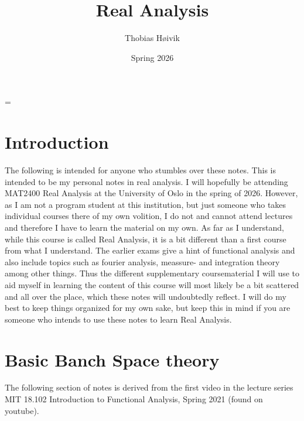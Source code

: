 
\hfuzz=\maxdimen

\title{\huge{Real Analysis}}
\author{\LARGE{Thobias Høivik}}
\date{\Large{Spring 2026}}


\maketitle

\newpage
\tableofcontents

\newpage
\section{Introduction}
The following is intended for anyone who stumbles over these notes. 
This is intended to be my personal notes in real analysis. 
I will hopefully be attending MAT2400 Real Analysis at 
the University of Oslo in the spring of 2026. However, 
as I am not a program student at this institution, but 
just someone who takes individual courses there 
of my own volition, I do not and cannot attend lectures and 
therefore I have to learn the material on my own. 
As far as I understand, while this course is called Real Analysis, 
it is a bit different than a first course from what I understand. 
The earlier exams give a hint of functional analysis and 
also include topics such as fourier analysis, meassure- and integration
theory among other things. Thus the different supplementary 
coursematerial I will use to aid myself in learning the content 
of this course will most likely be a bit scattered and all over the 
place, which these notes will undoubtedly reflect. I will 
do my best to keep things organized for my own sake, but keep 
this in mind if you are someone who intends to use these 
notes to learn Real Analysis. 

\newpage 
\section{Basic Banch Space theory}
The following section of notes is derived from the first video 
in the lecture series MIT 18.102 Introduction to Functional 
Analysis, Spring 2021 (found on youtube). 

